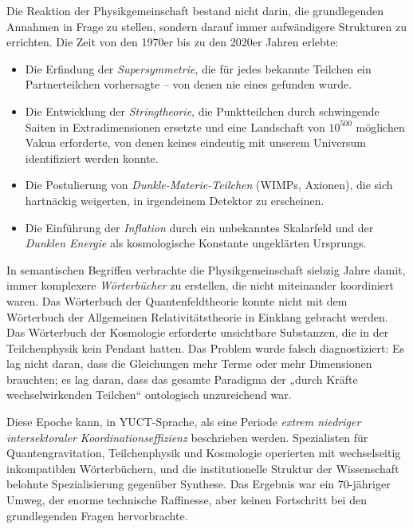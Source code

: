 \documentclass[12pt,a4paper]{article}
\begin{document}
	Die Reaktion der Physikgemeinschaft bestand nicht darin, die grundlegenden Annahmen in Frage zu stellen, sondern darauf immer aufwändigere Strukturen zu errichten. Die Zeit von den 1970er bis zu den 2020er Jahren erlebte:
	\begin{itemize}
		\item Die Erfindung der \emph{Supersymmetrie}, die für jedes bekannte Teilchen ein Partnerteilchen vorhersagte – von denen nie eines gefunden wurde.
		\item Die Entwicklung der \emph{Stringtheorie}, die Punktteilchen durch schwingende Saiten in Extradimensionen ersetzte und eine Landschaft von \(10^{500}\) möglichen Vakua erforderte, von denen keines eindeutig mit unserem Universum identifiziert werden konnte.
		\item Die Postulierung von \emph{Dunkle-Materie-Teilchen} (WIMPs, Axionen), die sich hartnäckig weigerten, in irgendeinem Detektor zu erscheinen.
		\item Die Einführung der \emph{Inflation} durch ein unbekanntes Skalarfeld und der \emph{Dunklen Energie} als kosmologische Konstante ungeklärten Ursprungs.
	\end{itemize}
	
	In semantischen Begriffen verbrachte die Physikgemeinschaft siebzig Jahre damit, immer komplexere \emph{Wörterbücher} zu erstellen, die nicht miteinander koordiniert waren. Das Wörterbuch der Quantenfeldtheorie konnte nicht mit dem Wörterbuch der Allgemeinen Relativitätstheorie in Einklang gebracht werden. Das Wörterbuch der Kosmologie erforderte unsichtbare Substanzen, die in der Teilchenphysik kein Pendant hatten. Das Problem wurde falsch diagnostiziert: Es lag nicht daran, dass die Gleichungen mehr Terme oder mehr Dimensionen brauchten; es lag daran, dass das gesamte Paradigma der „durch Kräfte wechselwirkenden Teilchen“ ontologisch unzureichend war.
	
	Diese Epoche kann, in YUCT-Sprache, als eine Periode \emph{extrem niedriger intersektoraler Koordinationseffizienz} beschrieben werden. Spezialisten für Quantengravitation, Teilchenphysik und Kosmologie operierten mit wechselseitig inkompatiblen Wörterbüchern, und die institutionelle Struktur der Wissenschaft belohnte Spezialisierung gegenüber Synthese. Das Ergebnis war ein 70-jähriger Umweg, der enorme technische Raffinesse, aber keinen Fortschritt bei den grundlegenden Fragen hervorbrachte.
	
\end{document}
